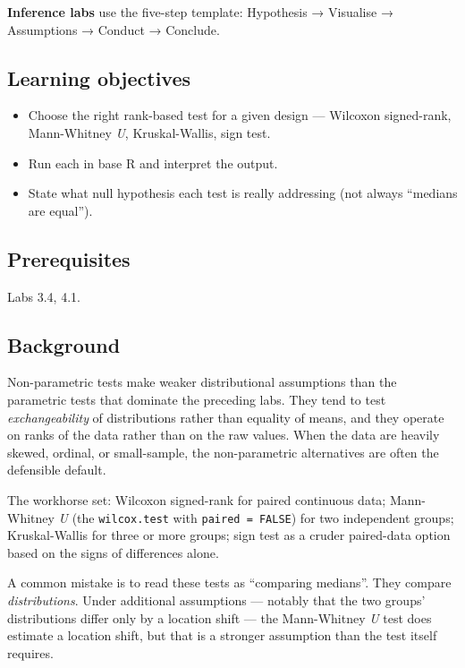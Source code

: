 \documentclass[
]{article}
\author{}
\date{\vspace{-2.5em}}
\providecommand{\tightlist}{%
  \setlength{\itemsep}{0pt}\setlength{\parskip}{0pt}}
\begin{document}
\textbf{Inference labs} use the five-step template: Hypothesis →
Visualise → Assumptions → Conduct → Conclude.

\subsection{Learning objectives}\label{learning-objectives}

\begin{itemize}
\tightlist
\item
  Choose the right rank-based test for a given design --- Wilcoxon
  signed-rank, Mann-Whitney \emph{U}, Kruskal-Wallis, sign test.
\item
  Run each in base R and interpret the output.
\item
  State what null hypothesis each test is really addressing (not always
  ``medians are equal'').
\end{itemize}

\subsection{Prerequisites}\label{prerequisites}

Labs 3.4, 4.1.

\subsection{Background}\label{background}

Non-parametric tests make weaker distributional assumptions than the
parametric tests that dominate the preceding labs. They tend to test
\emph{exchangeability} of distributions rather than equality of means,
and they operate on ranks of the data rather than on the raw values.
When the data are heavily skewed, ordinal, or small-sample, the
non-parametric alternatives are often the defensible default.

The workhorse set: Wilcoxon signed-rank for paired continuous data;
Mann-Whitney \emph{U} (the \texttt{wilcox.test} with
\texttt{paired\ =\ FALSE}) for two independent groups; Kruskal-Wallis
for three or more groups; sign test as a cruder paired-data option based
on the signs of differences alone.

A common mistake is to read these tests as ``comparing medians''. They
compare \emph{distributions}. Under additional assumptions --- notably
that the two groups' distributions differ only by a location shift ---
the Mann-Whitney \emph{U} test does estimate a location shift, but that
is a stronger assumption than the test itself requires.
\end{document}
